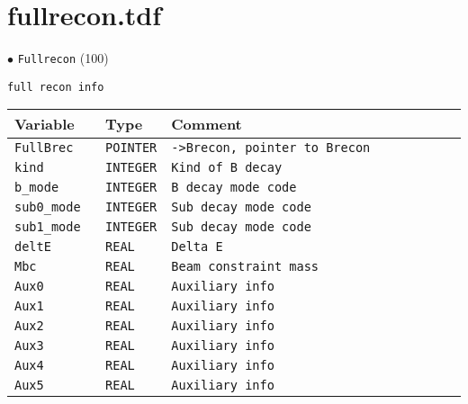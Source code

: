 \section{fullrecon.tdf}

\noindent
\begin{minipage}{\linewidth}
{\LARGE $\bullet$ \verb+Fullrecon+} (100)
\label{Fullrecon}
\begin{verbatim}
full recon info
\end{verbatim}
\begin{tabular}{|l|l|l|l|}\hline
Variable & Type & Comment\\ \hline\hline
\verb+FullBrec    + & \verb+POINTER+ & \verb"->Brecon, pointer to Brecon                                        "\\
\verb+kind        + & \verb+INTEGER+ & \verb"Kind of B decay                                                    "\\
\verb+b_mode      + & \verb+INTEGER+ & \verb"B decay mode code                                                  "\\
\verb+sub0_mode   + & \verb+INTEGER+ & \verb"Sub decay mode code                                                "\\
\verb+sub1_mode   + & \verb+INTEGER+ & \verb"Sub decay mode code                                                "\\
\verb+deltE       + & \verb+REAL   + & \verb"Delta E                                                            "\\
\verb+Mbc         + & \verb+REAL   + & \verb"Beam constraint mass                                               "\\
\verb+Aux0        + & \verb+REAL   + & \verb"Auxiliary info                                                     "\\
\verb+Aux1        + & \verb+REAL   + & \verb"Auxiliary info                                                     "\\
\verb+Aux2        + & \verb+REAL   + & \verb"Auxiliary info                                                     "\\
\verb+Aux3        + & \verb+REAL   + & \verb"Auxiliary info                                                     "\\
\verb+Aux4        + & \verb+REAL   + & \verb"Auxiliary info                                                     "\\
\verb+Aux5        + & \verb+REAL   + & \verb"Auxiliary info                                                     "\\

\end{tabular}
\end{minipage}
